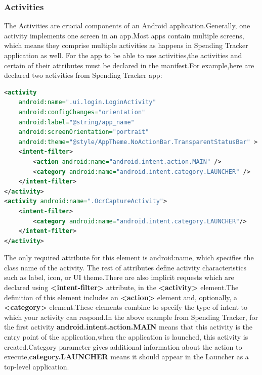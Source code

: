 \subsubsection{Activities}
The Activities are crucial components of an Android application.Generally, one activity implements one screen in an app.Most apps contain multiple screens, which means they comprise multiple activities as happens in Spending Tracker application as well.
For the app to be able to use activities,the activities and certain of their attributes must be declared in the manifest.For example,here are declared two activities from Spending Tracker app:
\begin{lstlisting}[caption={AndroidManifest.xml},label={AndroidManifest.xml},language = XML]
<activity
	android:name=".ui.login.LoginActivity"
	android:configChanges="orientation"
	android:label="@string/app_name"
	android:screenOrientation="portrait"
	android:theme="@style/AppTheme.NoActionBar.TransparentStatusBar" >
	<intent-filter>
 		<action android:name="android.intent.action.MAIN" />
		<category android:name="android.intent.category.LAUNCHER" />
	</intent-filter>
</activity>
<activity android:name=".OcrCaptureActivity">
	<intent-filter>
		<category android:name="android.intent.category.LAUNCHER"/>
	</intent-filter>
</activity>
\end{lstlisting}
The only required attribute for this element is android:name, which specifies the class name of the activity. The rest of attributes define activity characteristics such as label, icon, or UI theme.There are also implicit requests which are declared using \textbf{<intent-filter>} attribute, in the \textbf{<activity>} element.The definition of this element includes an \textbf{<action>} element and, optionally, a \textbf{<category>} element.These elements combine to specify the type of intent to which your activity can respond.In the above example from Spending Tracker, for the first activity \textbf{android.intent.action.MAIN} means that this activity is the entry point of the application,when the application is launched, this activity is created.Category parameter gives additional information about the action to execute,\textbf{category.LAUNCHER} means it should appear in the Launcher as a top-level application.

